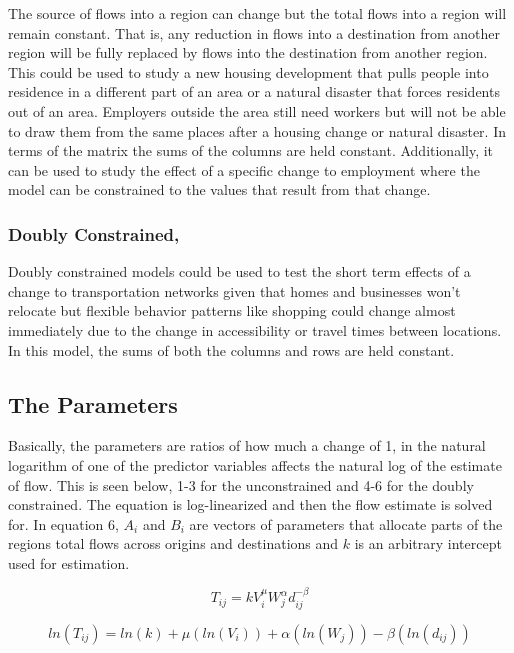 \documentclass[11pt]{article} %
\begin{document}
The source of flows into a region can change but the total flows into a region will remain constant. That is, any reduction in flows into a destination from another region will be fully replaced by flows into the destination from another region.  This could be used to study a new housing development that pulls people into residence in a different part of an area or a natural disaster that forces residents out of an area. Employers outside the area still need workers but will not be able to draw them from the same places after a housing change or natural disaster. In terms of the matrix the sums of the columns are held constant. Additionally, it can be used to study the effect of a specific change to employment where the model can be constrained to the values that result from that change. 

\subsubsection{Doubly Constrained,}

Doubly constrained models could be used to test the short term effects of a change to transportation networks given that homes and businesses won't relocate but flexible behavior patterns like shopping could change almost immediately due to the change in accessibility or travel times between locations. In this model, the sums of both the columns and rows are held constant.

\subsection{The Parameters}

Basically, the parameters are ratios of how much a change of 1, in the natural logarithm of one of the predictor variables affects the natural log of the estimate of flow. This is seen below, 1-3 for the unconstrained and 4-6 for the doubly constrained. The equation is log-linearized and then the flow estimate is solved for. In equation 6, $A_i$ and $B_i$ are vectors of parameters that allocate parts of the regions total flows across origins and destinations and $k$ is an arbitrary intercept used for estimation. 

\begin{equation}
T_{ij} = k V_i ^{\mu} W_j^{\alpha} d_{ij}^{-\beta}
\end{equation}

\begin{equation}
ln(T_{ij}) = ln(k) + \mu (ln(V_i)) +  \alpha( ln(W_j)) - \beta (ln(d_{ij}))
\end{equation}
\end{document}

